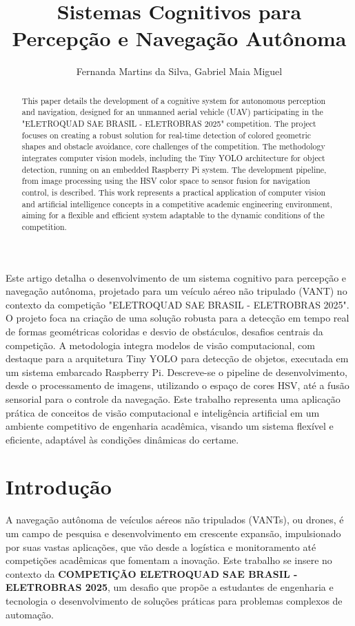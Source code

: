 \documentclass{SBCbookchapter}
\author{Fernanda Martins da Silva, Gabriel Maia Miguel}
\title{Sistemas Cognitivos para Percepção e Navegação Autônoma}
\begin{document}
\maketitle

\begin{abstract}
This paper details the development of a cognitive system for autonomous perception and navigation, designed for an unmanned aerial vehicle (UAV) participating in the "ELETROQUAD SAE BRASIL - ELETROBRAS 2025" competition. The project focuses on creating a robust solution for real-time detection of colored geometric shapes and obstacle avoidance, core challenges of the competition. The methodology integrates computer vision models, including the Tiny YOLO architecture for object detection, running on an embedded Raspberry Pi system. The development pipeline, from image processing using the HSV color space to sensor fusion for navigation control, is described. This work represents a practical application of computer vision and artificial intelligence concepts in a competitive academic engineering environment, aiming for a flexible and efficient system adaptable to the dynamic conditions of the competition.
\end{abstract}

\begin{resumo}
\begin{otherlanguage}{brazilian}
Este artigo detalha o desenvolvimento de um sistema cognitivo para percepção e navegação autônoma, projetado para um veículo aéreo não tripulado (VANT) no contexto da competição "ELETROQUAD SAE BRASIL - ELETROBRAS 2025". O projeto foca na criação de uma solução robusta para a detecção em tempo real de formas geométricas coloridas e desvio de obstáculos, desafios centrais da competição. A metodologia integra modelos de visão computacional, com destaque para a arquitetura Tiny YOLO para detecção de objetos, executada em um sistema embarcado Raspberry Pi. Descreve-se o pipeline de desenvolvimento, desde o processamento de imagens, utilizando o espaço de cores HSV, até a fusão sensorial para o controle da navegação. Este trabalho representa uma aplicação prática de conceitos de visão computacional e inteligência artificial em um ambiente competitivo de engenharia acadêmica, visando um sistema flexível e eficiente, adaptável às condições dinâmicas do certame.
\end{otherlanguage}
\end{resumo}
\pagebreak

\section{Introdução}
A navegação autônoma de veículos aéreos não tripulados (VANTs), ou drones, é um campo de pesquisa e desenvolvimento em crescente expansão, impulsionado por suas vastas aplicações, que vão desde a logística e monitoramento até competições acadêmicas que fomentam a inovação. Este trabalho se insere no contexto da \textbf{COMPETIÇÃO ELETROQUAD SAE BRASIL - ELETROBRAS 2025}, um desafio que propõe a estudantes de engenharia e tecnologia o desenvolvimento de soluções práticas para problemas complexos de automação.
\end{document}
